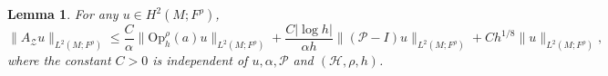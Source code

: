 \documentclass[11pt,oneside,reqno]{amsart}
\newtheorem{lemma}[theorem]{Lemma}
\theoremstyle{definition}
\numberwithin{equation}{section}
\theoremstyle{plain}
\begin{document}
\begin{lemma}\label{estimateofcontrolpart}
For any $u \in H^2(M;F^{\rho})$, 
\begin{equation}\label{estimateofonecontrolledpart}
\|A_{\mathcal{Z}} u\|_{L^2(M;F^\rho)} \leq \frac{C}{\alpha}\|\mathrm{Op}_h^{\rho}(a) u\|_{L^2(M;F^\rho)}+\frac{C|\log h|}{\alpha h}\|(\mathcal{P}-I) u\|_{L^2(M;F^\rho)}+ Ch^{1/8} \|u\|_{L^2(M;F^\rho)},
\end{equation}
where the constant $C>0$ is independent of $u,\alpha,\mathcal{P}$ and $(\mathcal{H},\rho,h)$.
\end{lemma}
\end{document}
